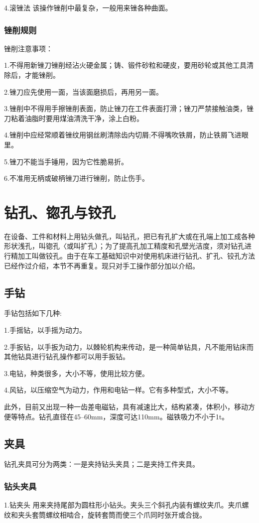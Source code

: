 \documentclass{ctexbook}
\begin{document}
4.滚锉法 该操作锉削中最复杂，一般用来锉各种曲面。

\subsubsection{锉削规则}
锉削注意事项：

1.不得用新锉刀锉削经沾火硬金属；铸、锻件砂粒和硬皮，要用砂轮或其他工具清除后，才能锉削。

2.锉刀应先使用一面，当该面磨损后，再用另一面。

3.锉削中不得用手擦锉削表面，防止锉刀在工件表面打滑；锉刀严禁接触油类，锉刀粘着油脂时要用煤油清洗干净，涂上白粉。

4.锉削中应经常顺着锉纹用钢丝刷清除齿内切屑;不得嘴吹铁屑，防止铁屑飞进眼里。

5.锉刀不能当手锤用，因为它性脆易折。

6.不准用无柄或破柄锉刀进行锉削，防止伤手。
\section{钻孔、锪孔与铰孔}
在设备、工件和材料上用钻头做孔，叫钻孔，把已有孔扩大或在孔端上加工成各种形状浅孔，叫锪孔〈或叫扩孔）；为了提高孔加工精度和孔壁光洁度，须对钻孔进行精加工叫做铰孔。由于在车工基础知识中对使用机床进行钻孔、扩孔、铰孔方法已经作过介绍，本节不再重复。现只对手工操作部分加以介绍。
\subsection{手钻}
手钻包括如下几种:

1.手摇钻，以手摇为动力。

2.手扳钻，以手扳为动力，以棘轮机构来传动，是一种简单钻具，凡不能用钻床而其他钻具进行钻孔操作都可以用手扳钻。

3.电钻，种类很多，大小不等，使用比较方便。

4.风钻，以压缩空气为动力，作用和电钻一样。它有多种型式，大小不等。

此外，目前又出现一种一齿差电磁钻，具有减速比大，结构紧凑，体积小，移动方便等特点。钻孔直径在45--60mm，深度可达110mm。磁铁吸力不小于1t。
\subsection{夹具}
钻孔夹具可分为两类：一是夹持钻头夹具；二是夹持工件夹具。
\subsubsection{钻头夹具}
1.钻夹头 用来夹持尾部为圆柱形小钻头。夹头三个斜孔内装有螺纹夹爪。夹爪螺纹和夹头套筒螺纹相啮合，旋转套筒而使三个爪同时张开或合拢。
\end{document}
